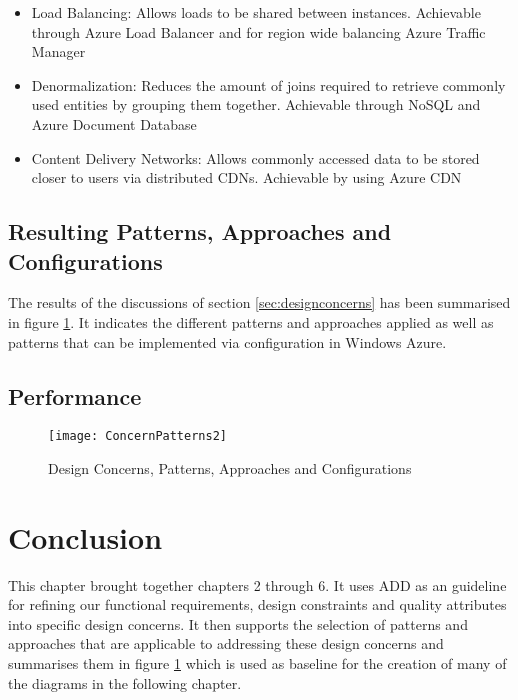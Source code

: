 \begin{itemize}
\item Load Balancing: Allows loads to be shared between instances. Achievable through Azure Load Balancer and for region wide balancing Azure Traffic Manager
\item Denormalization: Reduces the amount of joins required to retrieve commonly used entities by grouping them together. Achievable through NoSQL and Azure Document Database
\item Content Delivery Networks: Allows commonly accessed data to be stored closer to users via distributed CDNs. Achievable by using Azure CDN
\end{itemize}

\subsection{Resulting Patterns, Approaches and Configurations}
The results of the discussions of section \ref{sec:designconcerns} has been summarised in figure \ref{fig:concernpatterns}. It indicates the different patterns and approaches applied as well as patterns that can be implemented via configuration in Windows Azure.

\subsection {Performance}
\begin{figure}
\centering
\texttt{[image: ConcernPatterns2]}
\caption{Design Concerns, Patterns, Approaches and Configurations}
\label{fig:concernpatterns}
\end{figure}

\section{Conclusion}
This chapter brought together chapters 2 through 6. It uses ADD as an guideline for refining our functional requirements, design constraints and quality attributes into specific design concerns. It then supports the selection of patterns and approaches that are applicable to addressing these design concerns and summarises them in figure \ref{fig:concernpatterns} which is used as baseline for the creation of many of the diagrams in the following chapter. 